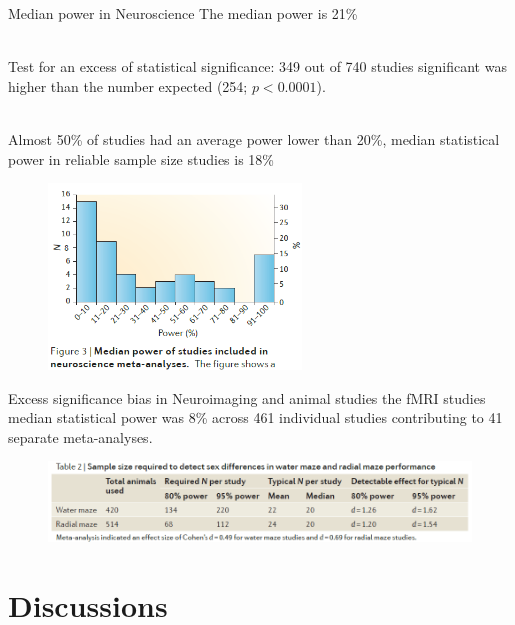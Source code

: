 \documentclass{beamer}
\begin{document}
	\begin{frame}{Median power in Neuroscience}
		The median power is 21\%
		
		\fontsize{10pt}{12pt}\selectfont
		~\\Test for an excess of statistical significance: 349 out of 740 studies significant was higher than the number expected (254; $p < 0.0001$).
		
		\fontsize{10pt}{12pt}\selectfont
		~\\Almost 50\% of studies had an average power lower than 20\%, median statistical power in reliable sample size studies is 18\%
		
		
		\begin{figure}[H]
			\centering
			\includegraphics[width=0.6\textwidth]{pics/median power.png}
		\end{figure}
	\end{frame}
	
	\begin{frame}{Excess significance bias in Neuroimaging and animal studies}
		the fMRI studies median statistical power was 8\% across 461 individual studies contributing to 41 separate meta-analyses.
		
		\begin{figure}[H]
			\centering
			\includegraphics[width=1\textwidth]{pics/animal power.png}
		\end{figure}
	\end{frame}
	
	\section{Discussions}
	
\end{document}
